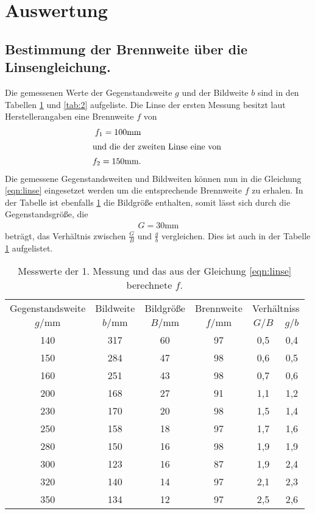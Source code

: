 \section{Auswertung}
\label{sec:Auswertung}
\subsection{Bestimmung der Brennweite über die Linsengleichung.}
\label{sec:1}
Die gemessenen Werte der Gegenstandsweite $g$ und der Bildweite $b$  sind
in den Tabellen \ref{tab:1} und \ref{tab:2} aufgeliste.
Die Linse der ersten Messung besitzt laut Herstellerangaben eine Brennweite $f$
von
\begin{align*}
  f_1=100\si{\milli\meter}\\
\intertext{und die der zweiten Linse eine von }
  f_2=150\si{\milli\meter}.
\end{align*}
Die gemessene Gegenstandsweiten und Bildweiten können nun in die Gleichung
\eqref{eqn:linse} eingesetzet werden um die entsprechende Brennweite $f$
zu erhalen.
In der Tabelle ist ebenfalls \ref{tab:1}
die Bildgröße enthalten, somit lässt sich durch die Gegenstandsgröße, die
\begin{align*}
  G=30\si{\milli\meter}
\end{align*}
beträgt, das Verhältnis zwischen $\frac{G}{B}$ und $\frac{g}{b}$ vergleichen. Dies ist auch
in der Tabelle \ref{tab:1} aufgelistet.
\begin{table}
  \centering
  \caption{Messwerte der 1. Messung und das aus der Gleichung
   \eqref{eqn:linse} berechnete $f$.}
  \label{tab:1}
  \begin{tabular}{c c c c c c}
  \toprule
  Gegenstandsweite   & Bildweite & Bildgröße & Brennweite & \multicolumn{2}{c}{Verhältniss}\\
  $g/\si{\milli\meter}$ & $b/\si{\milli\meter}$ & $B/\si{\milli\meter}$& $f/\si{\milli\meter}$& $G/B$ &$g/b$\\
  \midrule
  140   &   317  &   60 & 97 &0,5 &0,4 \\
  150   &   284  &   47 & 98 &0,6 &0,5 \\
  160   &   251  &   43 & 98 &0,7 &0,6 \\
  200   &   168  &   27 & 91 &1,1 &1,2 \\
  230   &   170  &   20 & 98 &1,5 &1,4 \\
  250   &   158  &   18 & 97 &1,7 &1,6 \\
  280   &   150  &   16 & 98 &1,9 &1,9 \\
  300   &   123  &   16 & 87 &1,9 &2,4 \\
  320   &   140  &   14 & 97 &2,1 &2,3 \\
  350   &   134  &   12 & 97 &2,5 &2,6 \\
  \bottomrule
 \end{tabular}
\end{table}
